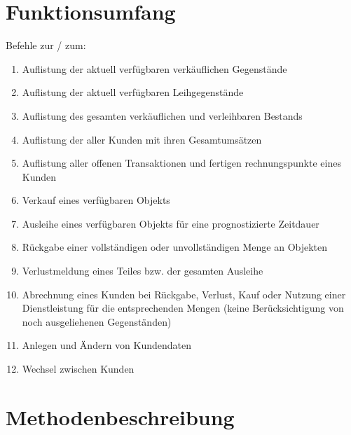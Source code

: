 \documentclass[a4paper,12pt,titlepage]{article}
\begin{document}
\part{Funktionsumfang}
Befehle zur / zum:
\begin{enumerate}
\item Auflistung der aktuell verfügbaren verkäuflichen Gegenstände
\item Auflistung der aktuell verfügbaren  Leihgegenstände
\item Auflistung des gesamten verkäuflichen und verleihbaren Bestands
\item Auflistung der aller Kunden mit ihren Gesamtumsätzen
\item Auflistung aller offenen Transaktionen  und fertigen rechnungspunkte eines Kunden
\item Verkauf eines verfügbaren Objekts
\item Ausleihe eines verfügbaren Objekts für eine prognostizierte Zeitdauer
\item Rückgabe einer vollständigen oder unvollständigen Menge an Objekten
\item Verlustmeldung eines Teiles bzw. der gesamten Ausleihe
\item Abrechnung eines Kunden bei  Rückgabe, Verlust, Kauf oder Nutzung einer Dienstleistung für die entsprechenden Mengen (keine Berücksichtigung von noch ausgeliehenen Gegenständen)
\item Anlegen und Ändern von Kundendaten
\item Wechsel zwischen Kunden
\end{enumerate}
\part{Methodenbeschreibung}
\end{document}
